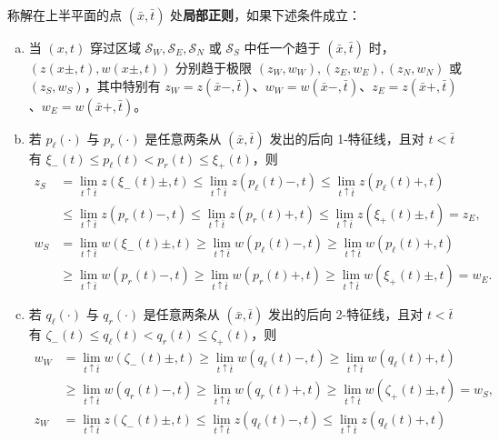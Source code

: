 \documentclass[../../main.tex]{subfiles}
\begin{document}
\begin{definition}[局部正则]\label{definition:ch12-局部正则}
称解在上半平面的点 $(\bar x,\bar t)$ 处\textbf{局部正则}，如果下述条件成立：
\begin{enumerate}[(a)]
\item\label{item:ch12-局部正则-a} 当 $(x,t)$ 穿过区域 $\mathscr{S}_W,\mathscr{S}_E,\mathscr{S}_N$ 或 $\mathscr{S}_S$ 中任一个趋于 $(\bar x,\bar t)$ 时，$(z(x\pm,t),w(x\pm,t))$ 分别趋于极限 $(z_W,w_W),(z_E,w_E),(z_N,w_N)$ 或 $(z_S,w_S)$，其中特别有 $z_W=z(\bar x-,\bar t)$、$w_W=w(\bar x-,\bar t)$、$z_E=z(\bar x+,\bar t)$、$w_E=w(\bar x+,\bar t)$。
\item\label{item:ch12-局部正则-b1} 若 $p_\ell(\cdot)$ 与 $p_r(\cdot)$ 是任意两条从 $(\bar x,\bar t)$ 发出的后向 1-特征线，且对 $t<\bar t$ 有 $\xi_-(t)\leqslant p_\ell(t)<p_r(t)\leqslant\xi_+(t)$，则
\begin{align}
z_S&=\lim_{t\uparrow\bar t}z(\xi_-(t)\pm,t)\leqslant\lim_{t\uparrow\bar t}z(p_\ell(t)-,t)\leqslant\lim_{t\uparrow\bar t}z(p_\ell(t)+,t)\nonumber\\
&\leqslant\lim_{t\uparrow\bar t}z(p_r(t)-,t)\leqslant\lim_{t\uparrow\bar t}z(p_r(t)+,t)\leqslant\lim_{t\uparrow\bar t}z(\xi_+(t)\pm,t)=z_E,
\label{align:ch12-正则1z}\\
w_S&=\lim_{t\uparrow\bar t}w(\xi_-(t)\pm,t)\geqslant\lim_{t\uparrow\bar t}w(p_\ell(t)-,t)\geqslant\lim_{t\uparrow\bar t}w(p_\ell(t)+,t)\nonumber\\
&\geqslant\lim_{t\uparrow\bar t}w(p_r(t)-,t)\geqslant\lim_{t\uparrow\bar t}w(p_r(t)+,t)\geqslant\lim_{t\uparrow\bar t}w(\xi_+(t)\pm,t)=w_E.
\label{align:ch12-正则1w}
\end{align}
\item\label{item:ch12-局部正则-b2} 若 $q_\ell(\cdot)$ 与 $q_r(\cdot)$ 是任意两条从 $(\bar x,\bar t)$ 发出的后向 2-特征线，且对 $t<\bar t$ 有 $\zeta_-(t)\leqslant q_\ell(t)<q_r(t)\leqslant\zeta_+(t)$，则
\begin{align}
w_W&=\lim_{t\uparrow\bar t}w(\zeta_-(t)\pm,t)\geqslant\lim_{t\uparrow\bar t}w(q_\ell(t)-,t)\geqslant\lim_{t\uparrow\bar t}w(q_\ell(t)+,t)\nonumber\\
&\geqslant\lim_{t\uparrow\bar t}w(q_r(t)-,t)\geqslant\lim_{t\uparrow\bar t}w(q_r(t)+,t)\geqslant\lim_{t\uparrow\bar t}w(\zeta_+(t)\pm,t)=w_S,
\label{align:ch12-正则2w}\\
z_W&=\lim_{t\uparrow\bar t}z(\zeta_-(t)\pm,t)\leqslant\lim_{t\uparrow\bar t}z(q_\ell(t)-,t)\leqslant\lim_{t\uparrow\bar t}z(q_\ell(t)+,t)\nonumber\\

\end{align}
\end{enumerate}
\end{definition}
\end{document}
